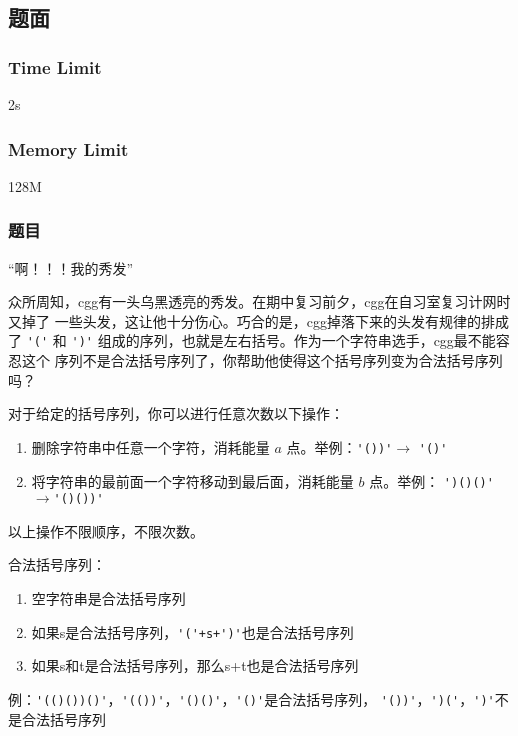 \subsection{题面}

\subsubsection{Time Limit}
2s

\subsubsection{Memory Limit}
128M

\subsubsection{题目}
“啊！！！我的秀发”

众所周知，cgg有一头乌黑透亮的秀发。在期中复习前夕，cgg在自习室复习计网时又掉了
一些头发，这让他十分伤心。巧合的是，cgg掉落下来的头发有规律的排成了 \verb|'('| 
和 \verb|')'| 组成的序列，也就是左右括号。作为一个字符串选手，cgg最不能容忍这个
序列不是合法括号序列了，你帮助他使得这个括号序列变为合法括号序列吗？

对于给定的括号序列，你可以进行任意次数以下操作：
\begin{enumerate}
    \item 删除字符串中任意一个字符，消耗能量 $a$ 点。举例：\verb|'())'|$\to$%
        \verb|'()'|
    \item 将字符串的最前面一个字符移动到最后面，消耗能量 $b$ 点。举例：%
        \verb|')()()'|$\to$\verb|'()())'|
\end{enumerate}

以上操作不限顺序，不限次数。

合法括号序列：
\begin{enumerate}
    \item 空字符串是合法括号序列
    \item 如果s是合法括号序列，\verb|'('+s+')'|也是合法括号序列
    \item 如果s和t是合法括号序列，那么s+t也是合法括号序列
\end{enumerate}

例：\verb|'(()())()'|，\verb|'(())'|，\verb|'()()'|，\verb|'()'|是合法括号序列，
\verb|'())'|，\verb|')('|，\verb|')'|不是合法括号序列

